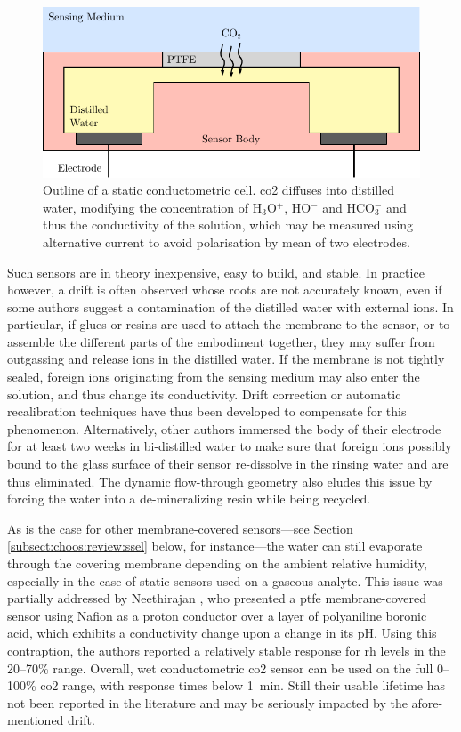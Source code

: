 \begin{figure}
	\centering
	\includegraphics{1_main_matter/choos_figures/review/wet_conduct}
	\caption[Outline of a static conductometric cell.]{Outline of a static conductometric cell. \gls{co2} diffuses into distilled water, modifying the concentration of H$_3$O$^+$, HO$^-$ and HCO$_3^-$ and thus the conductivity of the solution, which may be measured using alternative current to avoid polarisation by mean of two electrodes.}
	\label{fig:choos:review:conduct_outline}
\end{figure}

Such sensors are in theory inexpensive, easy to build, and stable. In practice however, a drift is often observed whose roots are not accurately known, even if some authors suggest a contamination of the distilled water with external ions. In particular, if glues or resins are used to attach the membrane to the sensor, or to assemble the different parts of the embodiment together, they may suffer from outgassing and release ions in the distilled water\cite{mirtaheri2004a}. If the membrane is not tightly sealed, foreign ions originating from the sensing medium may also enter the solution, and thus change its conductivity. Drift correction\cite{tronstad2010} or automatic recalibration\cite{wall1995a} techniques have thus been developed to compensate for this phenomenon. Alternatively, other authors immersed the body of their electrode for at least two weeks in bi-distilled water to make sure that foreign ions possibly bound to the glass surface of their sensor re-dissolve in the rinsing water and are thus eliminated\cite{lis1979}. The dynamic flow-through geometry also eludes this issue by forcing the water into a de-mineralizing resin while being recycled.

As is the case for other membrane-covered sensors---see Section \ref{subsect:choos:review:ssel} below, for instance---the water can still evaporate through the covering membrane depending on the ambient relative humidity, especially in the case of static sensors used on a gaseous analyte. This issue was partially addressed by Neethirajan \etal{}\cite{neethirajan2010}, who presented a \gls{ptfe} membrane-covered sensor using Nafion as a proton conductor over a layer of polyaniline boronic acid, which exhibits a conductivity change upon a change in its pH. Using this contraption, the authors reported a relatively stable response for \gls{rh} levels in the 20--70\% range. Overall, wet conductometric \gls{co2} sensor can be used on the full 0--100\% \gls{co2} range, with response times below 1~min. Still their usable lifetime has not been reported in the literature and may be seriously impacted by the afore-mentioned drift.

